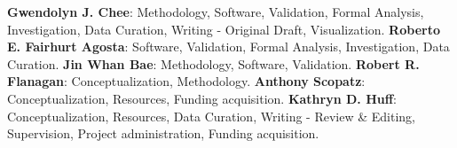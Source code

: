 \documentclass[]{article}
\begin{document}
\noindent
\textbf{Gwendolyn J. Chee}: Methodology, Software, Validation, 
Formal Analysis, Investigation, Data Curation, 
Writing - Original Draft, Visualization.
\textbf{Roberto E. Fairhurt Agosta}: Software, Validation,
Formal Analysis, Investigation, Data Curation.
\textbf{Jin Whan Bae}: Methodology, Software, Validation.
\textbf{Robert R. Flanagan}: Conceptualization, Methodology.
\textbf{Anthony Scopatz}: Conceptualization, Resources, 
Funding acquisition.
\textbf{Kathryn D. Huff}: Conceptualization, Resources, 
Data Curation, Writing - Review \& Editing, Supervision, 
Project administration, Funding acquisition.
\end{document}
